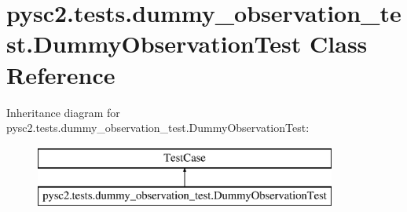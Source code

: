 \hypertarget{classpysc2_1_1tests_1_1dummy__observation__test_1_1_dummy_observation_test}{}\section{pysc2.\+tests.\+dummy\+\_\+observation\+\_\+test.\+Dummy\+Observation\+Test Class Reference}
\label{classpysc2_1_1tests_1_1dummy__observation__test_1_1_dummy_observation_test}
Inheritance diagram for pysc2.\+tests.\+dummy\+\_\+observation\+\_\+test.\+Dummy\+Observation\+Test\+:\begin{figure}[H]
\begin{center}
\leavevmode
\includegraphics[height=2.000000cm]{classpysc2_1_1tests_1_1dummy__observation__test_1_1_dummy_observation_test}
\end{center}
\end{figure}
